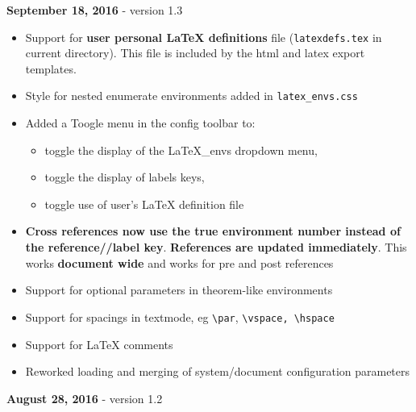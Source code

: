 \textbf{September 18, 2016} - version 1.3

\begin{itemize}
\tightlist
\item
  Support for \textbf{user personal LaTeX definitions} file
  (\texttt{latexdefs.tex} in current directory). This file is included
  by the html and latex export templates.\\
\item
  Style for nested enumerate environments added in
  \texttt{latex\_envs.css}
\item
  Added a Toogle menu in the config toolbar to:

  \begin{itemize}
  \tightlist
  \item
    toggle the display of the LaTeX\_envs dropdown menu,
  \item
    toggle the display of labels keys,
  \item
    toggle use of user's LaTeX definition file
  \end{itemize}
\item
  \textbf{Cross references now use the true environment number instead
  of the reference//label key}. \textbf{References are updated
  immediately}. This works \textbf{document wide} and works for pre and
  post references
\item
  Support for optional parameters in theorem-like environments
\item
  Support for spacings in textmode, eg \texttt{\textbackslash{}par},
  \texttt{\textbackslash{}vspace,\ \textbackslash{}hspace}
\item
  Support for LaTeX comments %
\item
  Reworked loading and merging of system/document configuration
  parameters
\end{itemize}

\textbf{August 28, 2016} - version 1.2

